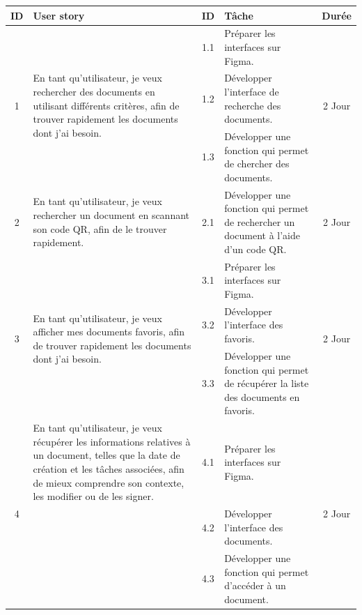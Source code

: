 \begin{adjustwidth}{-1cm}{}
    
    \begin{longtable}{|c|p{6cm}|c|p{6cm}|c|}
      \hline
      \textbf{ID} & \textbf{User story} & \textbf{ID}  & \textbf{Tâche} & \textbf{Durée} \\
      \hline
      \multirow{3}{*}{1} & \multirow{3}{6cm}{En tant qu'utilisateur, je veux rechercher des documents en utilisant différents critères, afin de trouver rapidement les documents dont j'ai besoin.} & 1.1 & Préparer les interfaces sur Figma. & \multirow{3}{*}{2 Jour} \\
      \cline{3-4}
      & & 1.2 & Développer l'interface de recherche des documents. & \\
      \cline{3-4}
      & & 1.3 & Développer une fonction qui permet de chercher des documents. & \\
      \cline{1-5}
      2 & En tant qu'utilisateur, je veux rechercher un document en scannant son code QR, afin de le trouver rapidement. & 2.1 & Développer une fonction qui permet de rechercher un document à l'aide d'un code QR. & 2 Jour \\
      \cline{1-5}
      \multirow{3}{*}{3} & \multirow{3}{6cm}{En tant qu'utilisateur, je veux afficher mes documents favoris, afin de trouver rapidement les documents dont j'ai besoin.}  & 3.1 & Préparer les interfaces sur Figma. & \multirow{3}{*}{2 Jour} \\
      \cline{3-4}
      & & 3.2 & Développer l'interface des favoris. & \\
      \cline{3-4}
      & & 3.3 & Développer une fonction qui permet de récupérer la liste des documents en favoris. & \\
      \cline{1-5}
      \multirow{4}{*}{4} & En tant qu'utilisateur, je veux récupérer les informations relatives à un document, telles que la date de création et les tâches associées, afin de mieux comprendre son contexte, les modifier ou de les signer. & 4.1 & Préparer les interfaces sur Figma. & \multirow{3}{*}{2 Jour} \\
      \cline{3-4}
      & & 4.2 & Développer l'interface des documents. & \\
      \cline{3-4}
      & & 4.3 & Développer une fonction qui permet d'accéder à un document. & \\

\end{longtable}
\end{adjustwidth}

